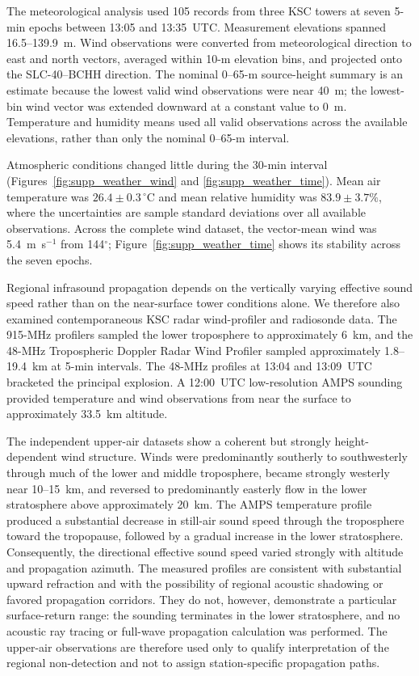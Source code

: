 \documentclass[]{seismica}
\begin{document}
The meteorological analysis used 105 records from three KSC towers at seven
5-min epochs between 13:05 and 13:35~UTC. Measurement elevations spanned
16.5--139.9~m. Wind observations were converted from meteorological direction
to east and north vectors, averaged within 10-m elevation bins, and projected
onto the SLC-40--BCHH direction. The nominal 0--65-m source-height summary is
an estimate because the lowest valid wind observations were near 40~m; the
lowest-bin wind vector was extended downward at a constant value to 0~m.
Temperature and humidity means used all valid observations across the
available elevations, rather than only the nominal 0--65-m interval.

Atmospheric conditions changed little during the 30-min interval
(Figures~\ref{fig:supp_weather_wind} and
\ref{fig:supp_weather_time}). Mean air temperature was
$26.4\pm0.3\,^{\circ}$C and mean relative humidity was
$83.9\pm3.7\%$, where the uncertainties are sample standard deviations over
all available observations. Across the complete wind dataset, the vector-mean
wind was 5.4~m~s$^{-1}$ from 144$^\circ$; Figure~\ref{fig:supp_weather_time}
shows its stability across the seven epochs.

Regional infrasound propagation depends on the vertically varying effective
sound speed rather than on the near-surface tower conditions alone. We therefore
also examined contemporaneous KSC radar wind-profiler and radiosonde data. The
915-MHz profilers sampled the lower troposphere to approximately 6~km, and the
48-MHz Tropospheric Doppler Radar Wind Profiler sampled approximately
1.8--19.4~km at 5-min intervals. The 48-MHz profiles at 13:04 and 13:09~UTC
bracketed the principal explosion. A 12:00~UTC low-resolution AMPS sounding
provided temperature and wind observations from near the surface to
approximately 33.5~km altitude.

The independent upper-air datasets show a coherent but strongly
height-dependent wind structure. Winds were predominantly southerly to
southwesterly through much of the lower and middle troposphere, became strongly
westerly near 10--15~km, and reversed to predominantly easterly flow in the
lower stratosphere above approximately 20~km. The AMPS temperature profile
produced a substantial decrease in still-air sound speed through the
troposphere toward the tropopause, followed by a gradual increase in the lower
stratosphere. Consequently, the directional effective sound speed varied
strongly with altitude and propagation azimuth. The measured profiles are
consistent with substantial upward refraction and with the possibility of
regional acoustic shadowing or favored propagation corridors. They do not,
however, demonstrate a particular surface-return range: the sounding terminates
in the lower stratosphere, and no acoustic ray tracing or full-wave propagation
calculation was performed. The upper-air observations are therefore used only
to qualify interpretation of the regional non-detection and not to assign
station-specific propagation paths.
\end{document}
